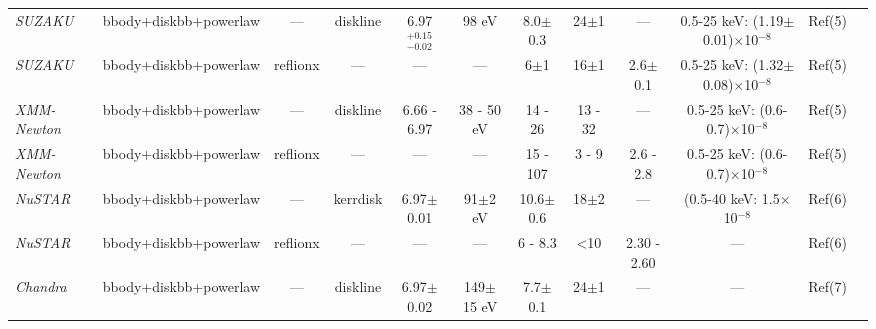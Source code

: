 \documentclass{aa}
\begin{document}
\begin{sidewaystable*}
\begin{tabular}{llcccccccccc}
\hline


\emph{SUZAKU}  & 
bbody+diskbb+powerlaw & 
--- &
diskline &
6.97 $^{+0.15}_{-0.02}$  &
98 eV &
8.0$\pm$0.3 &
24$\pm$1 &
--- &
0.5-25 keV: (1.19$\pm$0.01)$\times$10${^{-8}}$ &
Ref(5) \\


\emph{SUZAKU}  & 
bbody+diskbb+powerlaw & 
reflionx &
--- &
---  &
---  &
6$\pm$1 &
16$\pm$1 &
2.6$\pm$0.1 &
0.5-25 keV: (1.32$\pm$0.08)$\times$10${^{-8}}$ &
Ref(5) \\



\emph{XMM-Newton}  & 
bbody+diskbb+powerlaw & 
--- &
diskline &
6.66 - 6.97   &
38 - 50 eV &
14 - 26 &
13 - 32 &
--- &
0.5-25 keV: (0.6-0.7)$\times$10${^{-8}}$ &
Ref(5) \\


\emph{XMM-Newton}  & 
bbody+diskbb+powerlaw & 
reflionx &
--- &
--- &
---  &
15 - 107 &
3 - 9 &
2.6 - 2.8 &
0.5-25 keV: (0.6-0.7)$\times$10${^{-8}}$ &
Ref(5) \\

\hline 

\emph{NuSTAR}  & 
bbody+diskbb+powerlaw & 
--- &
kerrdisk &
6.97$\pm$0.01 &
91$\pm$2 eV &
10.6$\pm$0.6 &
18$\pm$2  &
--- &
(0.5-40 keV: 1.5$\times$10${^{-8}}$ &
Ref(6) \\


\emph{NuSTAR}  & 
bbody+diskbb+powerlaw & 
reflionx &
--- &
--- &
---  &
6 - 8.3  &
<10 &
2.30 - 2.60 &
--- &
Ref(6) \\




\hline 





\emph{Chandra}  & 
bbody+diskbb+powerlaw & 
--- &
diskline &
6.97$\pm$0.02  &
149$\pm$15 eV &
7.7$\pm$0.1 &
24$\pm$1 &
--- &
--- &
Ref(7) \\



\end{tabular}
\end{sidewaystable*}
\end{document}
